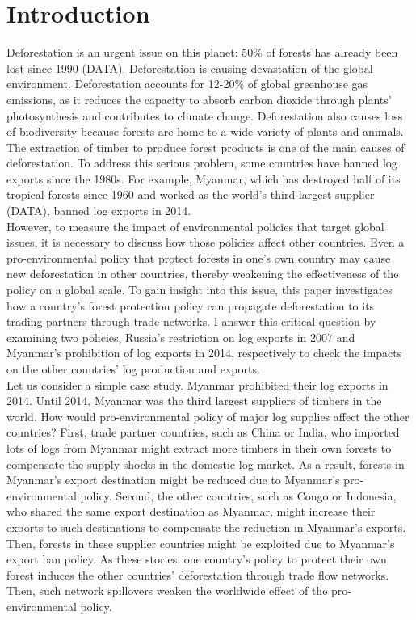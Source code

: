 \documentclass[a4paper,12pt]{article}
\begin{document}
\section{Introduction}
Deforestation is an urgent issue on this planet: 50\% of forests has already been lost since 1990 (DATA). Deforestation is causing devastation of the global environment. Deforestation accounts for 12-20\% of global greenhouse gas emissions, as it reduces the capacity to absorb carbon dioxide through plants' photosynthesis and contributes to climate change. Deforestation also causes loss of biodiversity because forests are home to a wide variety of plants and animals. The extraction of timber to produce forest products is one of the main causes of deforestation. To address this serious problem, some countries have banned log exports since the 1980s. For example, Myanmar, which has destroyed half of its tropical forests since 1960 and worked as the world's third largest supplier (DATA), banned log exports in 2014. \\

However, to measure the impact of environmental policies that target global issues, it is necessary to discuss how those policies affect other countries. Even a pro-environmental policy that protect forests in one's own country may cause new deforestation in other countries, thereby weakening the effectiveness of the policy on a global scale. To gain insight into this issue, this paper investigates how a country's forest protection policy can propagate deforestation to its trading partners through trade networks. I answer this critical question by examining two policies, Russia's restriction on log exports in 2007 and Myanmar's prohibition of log exports in 2014, respectively to check the impacts on the other countries' log production and exports.\\

Let us consider a simple case study. Myanmar prohibited their log exports in 2014. Until 2014, Myanmar was the third largest suppliers of timbers in the world. How would pro-environmental policy of major log supplies affect the other countries? First, trade partner countries, such as China or India, who imported lots of logs from Myanmar might extract more timbers in their own forests to compensate the supply shocks in the domestic log market. As a result, forests in Myanmar's export destination might be reduced due to Myanmar's pro-environmental policy. Second, the other countries, such as Congo or Indonesia, who shared the same export destination as Myanmar, might increase their exports to such destinations to compensate the reduction in Myanmar's exports. Then, forests in these supplier countries might be exploited due to Myanmar's export ban policy. As these stories, one country's policy to protect their own forest induces the other countries' deforestation through trade flow networks. Then, such network spillovers weaken the worldwide effect of the pro-environmental policy.\\
\end{document}
